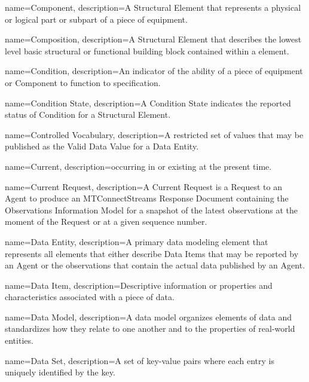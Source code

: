 {
    name={Component},
	description={A \gls{Structural Element} that represents a physical or logical part or subpart of a piece of equipment.}
}

{
    name={Composition},
	description={A \gls{Structural Element} that describes the lowest level basic structural or functional building block contained within a  element.}
}

{
    name={Condition},
	description={An indicator of the ability of a piece of equipment or \gls{Component} to function to specification.}
}

{
    name={Condition State},
	description={A \gls{Condition State} indicates the reported status of \gls{Condition} for a \gls{Structural Element}.}
}

{
    name={Controlled Vocabulary},
	description={A restricted set of values that may be published as the \gls{Valid Data Value} for a \gls{Data Entity}.}
}

{
    name={Current},
	description={occurring in or existing at the present time.}
}

{
    name={Current Request},
	description={A \gls{Current Request} is a \gls{Request} to an \gls{Agent} to produce an \gls{MTConnectStreams Response Document} containing the \gls{Observations Information Model} for a snapshot of the latest \glspl{observation} at the moment of the \gls{Request} or at a given \gls{sequence number}.}
}

{
    name={Data Entity},
	description={A primary data modeling element that represents all elements that either describe \glspl{Data Item} that may be reported by an \gls{Agent} or the \glspl{observation} that contain the actual data published by an \gls{Agent}.
}
}

{
    name={Data Item},
	description={Descriptive information or properties and characteristics associated with a piece of data.
}
}

{
    name={Data Model},
	description={A data model organizes elements of data and standardizes how they relate to one another and to the properties of real-world entities.}
}

{
    name={Data Set},
	description={A set of \glspl{key-value pair} where each entry is uniquely identified by the \gls{key}.}
}

